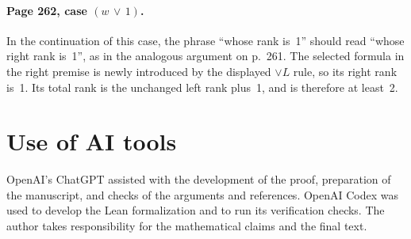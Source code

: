 \documentclass[11pt]{article}
\begin{document}
\paragraph{Page 262, case $(w\,\vee\,1)$.}
In the continuation of this case, the phrase ``whose rank is~1''
should read ``whose right rank is~1'', as in the analogous
argument on p.~261. The selected formula in the right premise
is newly introduced by the displayed $\vee L$ rule, so its right
rank is~1. Its total rank is the unchanged left rank plus~1,
and is therefore at least~2.

\section*{Use of AI tools}
OpenAI's ChatGPT assisted with the development of the proof, preparation
of the manuscript, and checks of the arguments and references. OpenAI Codex
was used to develop the Lean formalization and to run its verification
checks. The author takes responsibility for the mathematical claims and
the final text.
\end{document}
